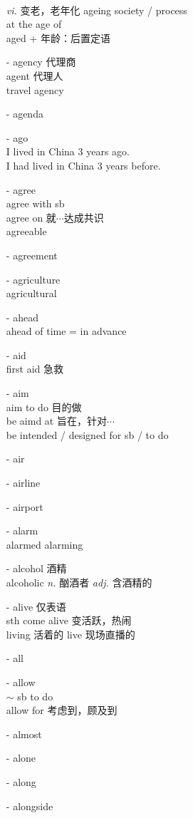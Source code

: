 \documentclass[../../book.tex]{subfiles}
\begin{document}
\begin{multicols}{2}
\begin{itemize}
\\\emph{vi.} 变老，老年化 ageing society / process
\\at the age of
\\aged + 年龄：后置定语
\item[-] agency 代理商
\\ agent 代理人
\\travel agency
\item[-] agenda
\item[-] ago
\\I lived in China 3 years ago.
\\I had lived in China 3 years before.
\item[-] agree
\\agree with sb
\\agree on 就$\cdots$达成共识
\\agreeable
\item[-] agreement
\item[-] agriculture
\\agricultural
\item[-] ahead
\\ahead of time = in advance
\item[-] aid
\\first aid 急救
\item[-] aim
\\aim to do 目的做
\\be aimd at 旨在，针对$\cdots$
\\be intended / designed for sb / to do
\item[-] air
\item[-] airline
\item[-] airport
\item[-] alarm
\\alarmed alarming
\item[-] alcohol 酒精
\\alcoholic \emph{n.} 酗酒者 \emph{adj.} 含酒精的
\item[-] alive 仅表语
\\sth come alive 变活跃，热闹
\\living 活着的 live 现场直播的
\item[-] all
\item[-] allow
\\$\sim$ sb to do
\\allow for 考虑到，顾及到
\item[-] almost
\item[-] alone
\item[-] along
\item[-] alongside

\end{itemize}
\end{multicols}
\end{document}
